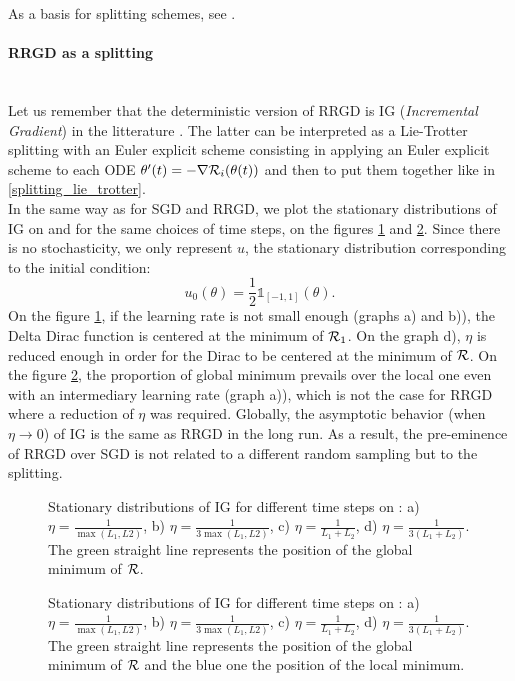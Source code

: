 As a basis for splitting schemes, see \cite{splitting_ode_review,splitting_ode_review2}.

\paragraph{RRGD as a splitting}
~~\\
Let us remember that the deterministic version of RRGD is IG ({\it Incremental Gradient}) in the litterature \cite{IG_proximal}. The latter can be interpreted as a Lie-Trotter
splitting with an Euler explicit scheme consisting in applying an Euler explicit scheme to each ODE $\theta'(t)=-\nabla \mathcal{R}_i(\theta(t))$ and then to put them together like in \eqref{splitting_lie_trotter}. \\
In the same way as for SGD and RRGD, we plot the stationary distributions of IG on \exOne and \exTwo for the same choices of time steps, on the figures \ref{IG_ex1} and \ref{IG_ex2}. Since there is no stochasticity, we only represent $u$, the stationary distribution corresponding to the initial condition:
\begin{equation*}
	u_0(\theta) = \frac{1}{2} \mathds{1}_{[-1,1]}(\theta).
\end{equation*}
On the figure \ref{IG_ex1}, if the learning rate is not small enough (graphs a) and b)), the Delta Dirac function is centered at the minimum of $\mathcal{R}_1$. On the graph d), $\eta$ is reduced enough in order for the Dirac to be centered at the minimum of $\mathcal{R}$. On the figure \ref{IG_ex2}, the proportion of global minimum prevails over the local one even with an intermediary learning rate (graph a)), which is not the case for RRGD where a reduction of $\eta$ was required. Globally, the asymptotic behavior (when $\eta \to 0$) of IG is the same as RRGD in the long run. As a result, the pre-eminence of RRGD over SGD is not related to a different random sampling but to the splitting.

\begin{figure}[h!]
	\centering
	\scalebox{0.45}{}
	\caption{Stationary distributions of IG for different time steps on \exOne: a) $\eta=\frac{1}{\max(L_1,L2)}$, b) $\eta=\frac{1}{3\max(L_1,L2)}$, c) $\eta=\frac{1}{L_1+L_2}$, d) $\eta=\frac{1}{3(L_1+L_2)}$. The green straight line represents the position of the global minimum of $\mathcal{R}$.}
	\label{IG_ex1}
\end{figure}

\begin{figure}[h!]
	\centering
	\scalebox{0.45}{}
	\caption{Stationary distributions of IG for different time steps on \exTwo: a) $\eta=\frac{1}{\max(L_1,L2)}$, b) $\eta=\frac{1}{3\max(L_1,L2)}$, c) $\eta=\frac{1}{L_1+L_2}$, d) $\eta=\frac{1}{3(L_1+L_2)}$. The green straight line represents the position of the global minimum of $\mathcal{R}$ and the blue one the position of the local minimum.}
	\label{IG_ex2}
\end{figure}

